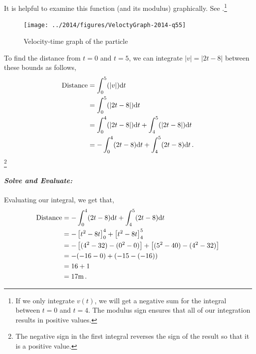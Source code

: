 \begin{subquestions}
\begin{subsubquestions}
\begin{subsubsubquestions}
			It is helpful to examine this function (and its modulus) graphically. See .\footnote{If we only integrate $v(t)$, we will get a negative sum for the integral between $t=0$ and $t=4$. The modulus sign ensures that all of our integration results in positive values.}
			\begin{figure}[H]
				\begin{center}
					\texttt{[image: ../2014/figures/VeloctyGraph-2014-q55]}
					\caption{\label{2014:q5*:VGraph1} Velocity-time graph of the particle}
				\end{center}
			\end{figure}
		
			To find the distance from $t=0$ and $t=5$, we can integrate $|v|=|2t-8|$ between these bounds as follows,
			\begin{align}
				\text{Distance} & = \int_{0}^{5} (|v|)\mathrm{d} t \nonumber \\
				                & = \int_{0}^{5} (|2t-8|)\mathrm{d} t \nonumber \\
				                & = \int_{0}^{4} (|2t-8|)\mathrm{d} t  + \int_{4}^{5} (|2t-8|)\mathrm{d} t \nonumber \\
				                & = -\int_{0}^{4} (2t-8)\mathrm{d} t  + \int_{4}^{5} (2t-8)\mathrm{d} t \,. 
			\end{align}\footnote{The negative sign in the first integral reverses the sign of the result so that it is a positive value.}
						
			\textbf{\textit{Solve and Evaluate:}} \\ \\
			Evaluating our integral, we get that,
			\begin{align}
				\text{Distance} & = -\int_{0}^{4} (2t-8)\mathrm{d} t  + \int_{4}^{5} (2t-8)\mathrm{d} t \nonumber \\
				                & = -\left[t^2-8t \right]_0^4 + \left[t^2-8t \right]_4^5 \nonumber \\
				                & = -\left[(4^2-32)-(0^2-0)\right] + \left[(5^2-40)-(4^2-32)\right] \nonumber \\
				                & = -(-16-0) + (-15 - (-16)) \nonumber \\
				                & = 16+1 \nonumber \\
				                & = 17 \text{m} \,. 
			\end{align}
			
			
			\subsubsubquestion
			

\end{subsubsubquestions}
\end{subsubquestions}
\end{subquestions}
